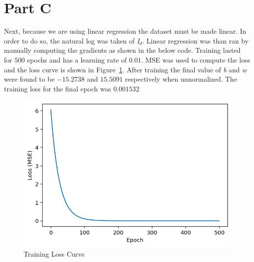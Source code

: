 \newpage
\section{Part C}
\label{sec:sec_c}

Next, because we are using linear regression the dataset must be made linear. In order to do so, the natural log was taken of \textit{I}$_{d}$. Linear regression was than ran by manually computing the gradients as shown in the below code. Training lasted for $500$ epochs and has a learning rate of $0.01$. MSE was used to compute the loss and the loss curve is shown in Figure~\ref{fig:loss}. After training the final value of \textit{b} and \textit{w} were found to be $-15.2738$ and $15.5091$ respectively when unnormalized. The training loss for the final epoch was $0.001532$


\begin{figure}[!htpb]
	\centering
	\includegraphics{figures/loss.png}
	\caption{Training Loss Curve}
	\label{fig:loss}
\end{figure}